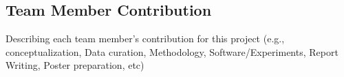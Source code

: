 \documentclass{article}
\newcommand{\instructions}[1]{{\color{blue} #1}}
\begin{document}
\subsection*{Team Member Contribution}
\instructions{Describing each team member's contribution for this project (e.g., conceptualization, Data curation, Methodology, Software/Experiments, Report Writing, Poster preparation, etc)} 



\end{document}
